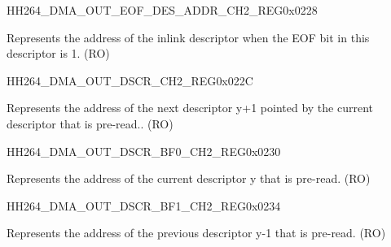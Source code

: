 \begin{register}{H}{H264\_DMA\_OUT\_EOF\_DES\_ADDR\_CH2\_REG}{0x0228}\label{regdesc:H264DMAOUTEOFDESADDRCH2REG}
%
\regnewline%
\begin{regdesc}\begin{reglist}
\label{fielddesc:H264DMAOUTEOFDESADDRCH2}\item [H264\_DMA\_OUT\_EOF\_DES\_ADDR\_CH2] Represents the address of the inlink descriptor when the EOF bit in this descriptor is 1. (RO)
\end{reglist}\end{regdesc}
\end{register}


\begin{register}{H}{H264\_DMA\_OUT\_DSCR\_CH2\_REG}{0x022C}\label{regdesc:H264DMAOUTDSCRCH2REG}
%
\regnewline%
\begin{regdesc}\begin{reglist}
\label{fielddesc:H264DMAOUTLINKDSCRCH2}\item [H264\_DMA\_OUTLINK\_DSCR\_CH2] Represents the address of the next descriptor y+1 pointed by the current descriptor that is pre-read.. (RO)
\end{reglist}\end{regdesc}
\end{register}


\begin{register}{H}{H264\_DMA\_OUT\_DSCR\_BF0\_CH2\_REG}{0x0230}\label{regdesc:H264DMAOUTDSCRBF0CH2REG}
%
\regnewline%
\begin{regdesc}\begin{reglist}
\label{fielddesc:H264DMAOUTLINKDSCRBF0CH2}\item [H264\_DMA\_OUTLINK\_DSCR\_BF0\_CH2] Represents the address of the current descriptor y that is pre-read. (RO)
\end{reglist}\end{regdesc}
\end{register}


\begin{register}{H}{H264\_DMA\_OUT\_DSCR\_BF1\_CH2\_REG}{0x0234}\label{regdesc:H264DMAOUTDSCRBF1CH2REG}
%
\regnewline%
\begin{regdesc}\begin{reglist}
\label{fielddesc:H264DMAOUTLINKDSCRBF1CH2}\item [H264\_DMA\_OUTLINK\_DSCR\_BF1\_CH2] Represents the address of the previous descriptor y-1 that is pre-read. (RO)
\end{reglist}\end{regdesc}
\end{register}

